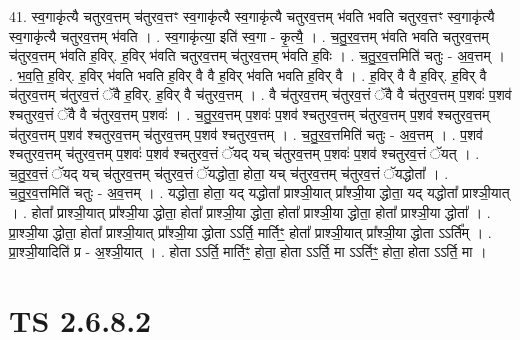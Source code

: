\documentclass[17pt]{extarticle}
\begin{document}
41. स्व॒गाकृ॑त्यै चतुरव॒त्तम् च॑तुरव॒त्तꣳ स्व॒गाकृ॑त्यै स्व॒गाकृ॑त्यै चतुरव॒त्तम् भ॑वति भवति चतुरव॒त्तꣳ स्व॒गाकृ॑त्यै स्व॒गाकृ॑त्यै चतुरव॒त्तम् भ॑वति । . स्व॒गाकृ॑त्या॒ इति॑ स्व॒गा - कृ॒त्यै॒ । . च॒तु॒र॒व॒त्तम् भ॑वति भवति चतुरव॒त्तम् च॑तुरव॒त्तम् भ॑वति ह॒विर्. ह॒विर् भ॑वति चतुरव॒त्तम् च॑तुरव॒त्तम् भ॑वति ह॒विः । . च॒तु॒र॒व॒त्तमिति॑ चतुः - अ॒व॒त्तम् । . भ॒व॒ति॒ ह॒विर्. ह॒विर् भ॑वति भवति ह॒विर् वै वै ह॒विर् भ॑वति भवति ह॒विर् वै । . ह॒विर् वै वै ह॒विर्. ह॒विर् वै च॑तुरव॒त्तम् च॑तुरव॒त्तं ॅवै ह॒विर्. ह॒विर् वै च॑तुरव॒त्तम् । . वै च॑तुरव॒त्तम् च॑तुरव॒त्तं ॅवै वै च॑तुरव॒त्तम् प॒शवः॑ प॒शव॑ श्चतुरव॒त्तं ॅवै वै च॑तुरव॒त्तम् प॒शवः॑ । . च॒तु॒र॒व॒त्तम् प॒शवः॑ प॒शव॑ श्चतुरव॒त्तम् च॑तुरव॒त्तम् प॒शव॑ श्चतुरव॒त्तम् च॑तुरव॒त्तम् प॒शव॑ श्चतुरव॒त्तम् च॑तुरव॒त्तम् प॒शव॑ श्चतुरव॒त्तम् । . च॒तु॒र॒व॒त्तमिति॑ चतुः - अ॒व॒त्तम् । . प॒शव॑ श्चतुरव॒त्तम् च॑तुरव॒त्तम् प॒शवः॑ प॒शव॑ श्चतुरव॒त्तं ॅयद् यच् च॑तुरव॒त्तम् प॒शवः॑ प॒शव॑ श्चतुरव॒त्तं ॅयत् । . च॒तु॒र॒व॒त्तं ॅयद् यच् च॑तुरव॒त्तम् च॑तुरव॒त्तं ॅयद्धोता॒ होता॒ यच् च॑तुरव॒त्तम् च॑तुरव॒त्तं ॅयद्धोता᳚ । . च॒तु॒र॒व॒त्तमिति॑ चतुः - अ॒व॒त्तम् । . यद्धोता॒ होता॒ यद् यद्धोता᳚ प्राश्ञी॒यात् प्रा᳚श्ञी॒या द्धोता॒ यद् यद्धोता᳚ प्राश्ञी॒यात् । . होता᳚ प्राश्ञी॒यात् प्रा᳚श्ञी॒या द्धोता॒ होता᳚ प्राश्ञी॒या द्धोता॒ होता᳚ प्राश्ञी॒या द्धोता॒ होता᳚ प्राश्ञी॒या द्धोता᳚ । . प्रा॒श्ञी॒या द्धोता॒ होता᳚ प्राश्ञी॒यात् प्रा᳚श्ञी॒या द्धोता ऽऽर्ति॒ मार्तिꣳ॒॒ होता᳚ प्राश्ञी॒यात् प्रा᳚श्ञी॒या द्धोता ऽऽर्ति᳚म् । . प्रा॒श्ञी॒यादिति॑ प्र - अ॒श्ञी॒यात् । . होता ऽऽर्ति॒ मार्तिꣳ॒॒ होता॒ होता ऽऽर्ति॒ मा ऽऽर्तिꣳ॒॒ होता॒ होता ऽऽर्ति॒ मा । \newline
\pagebreak
{}
\section*{ TS 2.6.8.2 }
\end{document}
